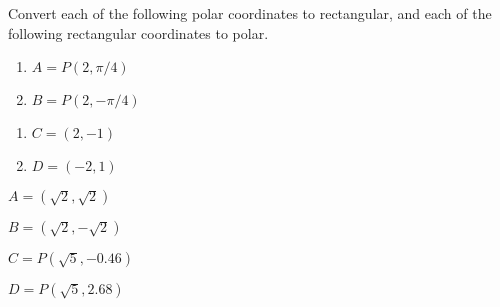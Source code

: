 {Convert each of the following polar coordinates to rectangular, and each of the following rectangular coordinates to polar.

\noindent\begin{minipage}[t]{.5\linewidth}
\begin{enumerate}
	\item $A=P(2,\pi/4)$
	\item $B=P(2,-\pi/4)$
\end{enumerate}
\end{minipage}
\begin{minipage}[t]{.5\linewidth}
\begin{enumerate}\addtocounter{enumii}{2}
	\item $C=(2,-1)$
	\item $D=(-2,1)$
\end{enumerate}
\end{minipage}
}
{$A=(\sqrt{2},\sqrt{2})$

$B=(\sqrt{2},-\sqrt{2})$

$C=P(\sqrt{5},-0.46)$

$D=P(\sqrt{5},2.68)$

	}
